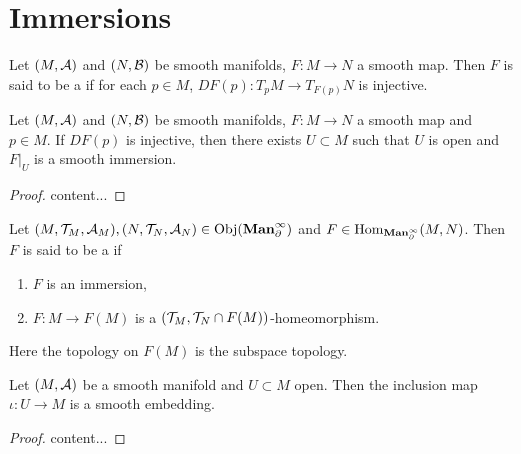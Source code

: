 \documentclass{book}
\begin{document}
	
	
	
	
	
	
	
	
	
	
	
	
	\newpage
	\section{Immersions}
	
	\begin{defn} 
		Let $(M, \mathcal{A})$ and $(N, \mathcal{B})$ be smooth manifolds, $F: M \rightarrow N$ a smooth map. Then $F$ is said to be a  if for each $p \in M$, $DF(p):T_pM\rightarrow T_{F(p)}N$ is injective.
	\end{defn}

	\begin{ex} 
		Let $(M, \mathcal{A})$ and $(N, \mathcal{B})$ be smooth manifolds, $F: M \rightarrow N$ a smooth map and $p \in M$. If $DF(p)$ is injective, then there exists $U \subset M$ such that $U$ is open and $F|_U$ is a smooth immersion.
	\end{ex}

	\begin{proof}
		content...
	\end{proof}
	
	\begin{defn}  
		Let $(M, \mathcal{T}_M, \mathcal{A}_M), (N, \mathcal{T}_N, \mathcal{A}_N) \in \operatorname{Obj}(\operatorname*{\text{\textbf{Man}}^{\infty}_{\partial}})$ and $F \in \operatorname{Hom}_{\operatorname*{\text{\textbf{Man}}^{\infty}_{\partial}}}(M,N)$. Then $F$ is said to be a  if 
		\begin{enumerate}
			\item $F$ is an immersion, 
			\item $F:M \rightarrow F(M)$ is a $(\mathcal{T}_M, \mathcal{T}_N \cap F(M))$-homeomorphism.
		\end{enumerate}	 
	\end{defn}	

	\begin{note}
	Here the topology on $F(M)$ is the subspace topology.
	\end{note}

	\begin{ex} 
		Let $(M, \mathcal{A})$ be a smooth manifold and $U \subset M$ open. Then the inclusion map $\iota:U \rightarrow M$ is a smooth embedding. 
	\end{ex}

	\begin{proof}
		content...
	\end{proof}
\end{document}

